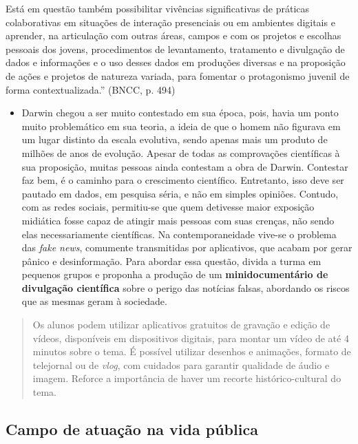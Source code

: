 \documentclass[12pt]{extarticle}
\begin{document}
Está em questão também possibilitar vivências significativas de práticas
colaborativas em situações de interação presenciais ou em ambientes
digitais e aprender, na articulação com outras áreas, campos e com os
projetos e escolhas pessoais dos jovens, procedimentos de levantamento,
tratamento e divulgação de dados e informações e o uso desses dados em
produções diversas e na proposição de ações e projetos de natureza
variada, para fomentar o protagonismo juvenil de forma
contextualizada.'' (BNCC, p. 494)

\begin{itemize}
\item
  Darwin chegou a ser muito contestado em sua época, pois, havia um
  ponto muito problemático em sua teoria, a ideia de que o homem não
  figurava em um lugar distinto da escala evolutiva, sendo apenas mais
  um produto de milhões de anos de evolução. Apesar de todas as
  comprovações científicas à sua proposição, muitas pessoas ainda
  contestam a obra de Darwin. Contestar faz bem, é o caminho para o
  crescimento científico. Entretanto, isso deve ser pautado em dados, em
  pesquisa séria, e não em simples opiniões. Contudo, com as redes
  sociais, permitiu-se que quem detivesse maior exposição midiática
  fosse capaz de atingir mais pessoas com suas crenças, não sendo elas
  necessariamente científicas. Na contemporaneidade vive-se o problema
  das \emph{fake news}, comumente transmitidas por aplicativos, que
  acabam por gerar pânico e desinformação. Para abordar essa questão,
  divida a turma em pequenos grupos e proponha a produção de um
  \textbf{minidocumentário de divulgação científica} sobre o perigo das
  notícias falsas, abordando os riscos que as mesmas geram à sociedade.
\end{itemize}

\begin{quote}
Os alunos podem utilizar aplicativos gratuitos de gravação e edição de
vídeos, disponíveis em dispositivos digitais, para montar um vídeo de
até 4 minutos sobre o tema. É possível utilizar desenhos e animações,
formato de telejornal ou de \emph{vlog}, com cuidados para garantir
qualidade de áudio e imagem. Reforce a importância de haver um recorte
histórico-cultural do tema.
\end{quote}

\subsection{Campo de atuação na vida pública}
\end{document}
